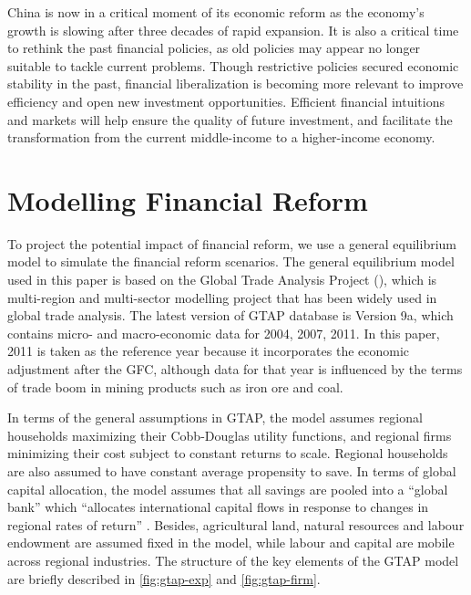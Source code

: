 \documentclass[AER]{AEA}
\begin{document}
China is now in a critical moment of its economic reform as the economy's growth  
is slowing after three decades of rapid expansion. It is also a critical 
time to rethink the past financial policies, as old policies may appear no longer 
suitable to tackle current problems. Though restrictive policies secured economic 
stability in the past, financial liberalization is becoming more relevant 
to improve efficiency and open new investment opportunities.
Efficient financial intuitions and markets will help ensure the 
quality of future investment, and facilitate the transformation 
from the current middle-income to a higher-income economy.\\


\section{Modelling Financial Reform}
\label{sec:model}

To project the potential impact of financial reform, we use 
a general equilibrium model to simulate the financial reform scenarios. 
The general equilibrium model used in this paper is based on the 
Global Trade Analysis Project (\citealp{gtap2016}), 
which is multi-region and multi-sector modelling project 
that has been widely used in global trade analysis. 
The latest version of GTAP database is Version 9a,
which contains micro- and macro-economic data for 
2004, 2007, 2011. 
In this paper, 2011 is taken as the reference year 
because it incorporates the economic adjustment after the GFC, 
although data for that year is influenced by the terms of trade 
boom in mining products such as iron ore and coal.

In terms of the general assumptions in GTAP, the model assumes regional 
households maximizing their Cobb-Douglas utility functions,  and regional 
firms minimizing their cost subject to constant returns to scale. 
Regional households are also assumed to have constant average propensity 
to save. In terms of global capital allocation, the model assumes 
that all savings are pooled into a ``global bank'' which ``allocates 
international capital flows in response to changes in regional rates 
of return'' \citep{gtap2016}. Besides, agricultural land, natural 
resources and labour endowment are assumed fixed in the model, while 
labour and capital are mobile across regional industries. 
The structure of the key elements of the GTAP model are briefly 
described in \autoref{fig:gtap-exp} and \autoref{fig:gtap-firm}.
\end{document}
